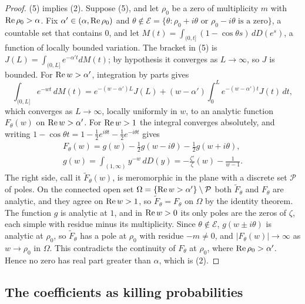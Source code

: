 \begin{proof}
(5) implies (2). Suppose (5), and let $\rho_0$ be a zero of multiplicity $m$ with $\operatorname{Re}\rho_0>\alpha$. Fix $\alpha'\in(\alpha,\operatorname{Re}\rho_0)$ and $\theta\notin\mathcal E=\{\theta:\rho_0+i\theta\text{ or }\rho_0-i\theta\text{ is a zero}\}$, a countable set that contains $0$, and let $M(t)=\int_{(0,t]}(1-\cos\theta s)\,dD(e^s)$, a function of locally bounded variation. The bracket in (5) is $J(L)=\int_{(0,L]}e^{-\alpha't}dM(t)$; by hypothesis it converges as $L\to\infty$, so $J$ is bounded. For $\operatorname{Re} w>\alpha'$, integration by parts gives
\[
\int_{(0,L]}e^{-wt}\,dM(t)=e^{-(w-\alpha')L}J(L)+(w-\alpha')\int_0^Le^{-(w-\alpha')t}J(t)\,dt,
\]
which converges as $L\to\infty$, locally uniformly in $w$, to an analytic function $F_\theta(w)$ on $\operatorname{Re} w>\alpha'$. For $\operatorname{Re} w>1$ the integral converges absolutely, and writing $1-\cos\theta t=1-\frac12e^{i\theta t}-\frac12e^{-i\theta t}$ gives
\begin{gather*}
F_\theta(w)=g(w)-\tfrac12g(w-i\theta)-\tfrac12g(w+i\theta),\\
g(w)=\int_{(1,\infty)}y^{-w}\,dD(y)=-\frac{\zeta'}\zeta(w)-\frac1{w-1}.
\end{gather*}
The right side, call it $\widetilde F_\theta(w)$, is meromorphic in the plane with a discrete set $\mathcal P$ of poles. On the connected open set $\Omega=\{\operatorname{Re} w>\alpha'\}\setminus\mathcal P$ both $\widetilde F_\theta$ and $F_\theta$ are analytic, and they agree on $\operatorname{Re} w>1$, so $\widetilde F_\theta=F_\theta$ on $\Omega$ by the identity theorem. The function $g$ is analytic at $1$, and in $\operatorname{Re} w>0$ its only poles are the zeros of $\zeta$, each simple with residue minus its multiplicity. Since $\theta\notin\mathcal E$, $g(w\pm i\theta)$ is analytic at $\rho_0$, so $\widetilde F_\theta$ has a pole at $\rho_0$ with residue $-m\ne0$, and $|F_\theta(w)|\to\infty$ as $w\to\rho_0$ in $\Omega$. This contradicts the continuity of $F_\theta$ at $\rho_0$, where $\operatorname{Re}\rho_0>\alpha'$. Hence no zero has real part greater than $\alpha$, which is (2).
\end{proof}

\subsection{The coefficients as killing probabilities}\label{ri:sec:kill}

